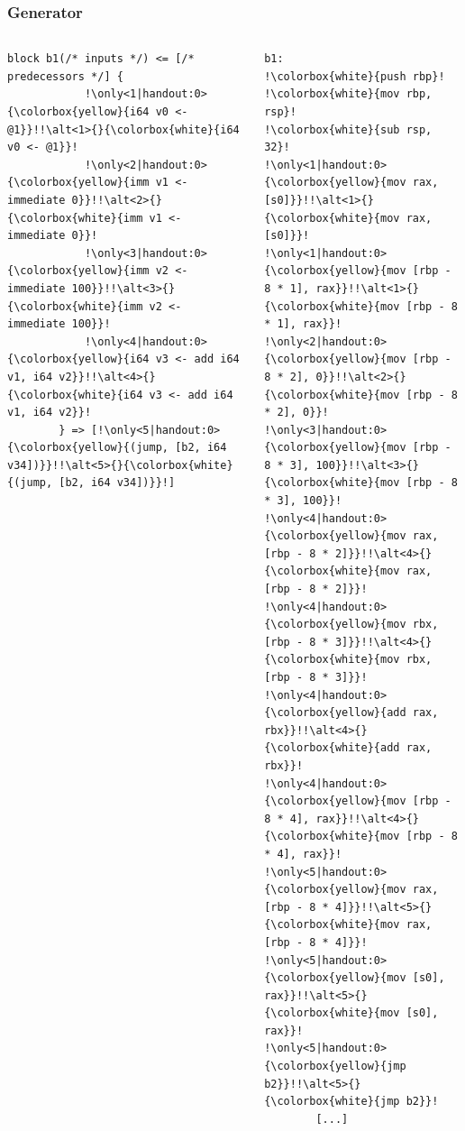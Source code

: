 \begin{frame}[fragile]
    \frametitle{Generator}
    \begin{columns}[c]
        \begin{lstlisting}[language=SbtIr, escapechar=!]
        block b1(/* inputs */) <= [/* predecessors */] {
            !\only<1|handout:0>{\colorbox{yellow}{i64 v0 <- @1}}!!\alt<1>{}{\colorbox{white}{i64 v0 <- @1}}!
            !\only<2|handout:0>{\colorbox{yellow}{imm v1 <- immediate 0}}!!\alt<2>{}{\colorbox{white}{imm v1 <- immediate 0}}!
            !\only<3|handout:0>{\colorbox{yellow}{imm v2 <- immediate 100}}!!\alt<3>{}{\colorbox{white}{imm v2 <- immediate 100}}!
            !\only<4|handout:0>{\colorbox{yellow}{i64 v3 <- add i64 v1, i64 v2}}!!\alt<4>{}{\colorbox{white}{i64 v3 <- add i64 v1, i64 v2}}!
        } => [!\only<5|handout:0>{\colorbox{yellow}{(jump, [b2, i64 v34])}}!!\alt<5>{}{\colorbox{white}{(jump, [b2, i64 v34])}}!]
    \end{lstlisting}


        \begin{lstlisting}[language=rv64, escapechar=!]
b1:
!\colorbox{white}{push rbp}!
!\colorbox{white}{mov rbp, rsp}!
!\colorbox{white}{sub rsp, 32}!
!\only<1|handout:0>{\colorbox{yellow}{mov rax, [s0]}}!!\alt<1>{}{\colorbox{white}{mov rax, [s0]}}!
!\only<1|handout:0>{\colorbox{yellow}{mov [rbp - 8 * 1], rax}}!!\alt<1>{}{\colorbox{white}{mov [rbp - 8 * 1], rax}}!
!\only<2|handout:0>{\colorbox{yellow}{mov [rbp - 8 * 2], 0}}!!\alt<2>{}{\colorbox{white}{mov [rbp - 8 * 2], 0}}!
!\only<3|handout:0>{\colorbox{yellow}{mov [rbp - 8 * 3], 100}}!!\alt<3>{}{\colorbox{white}{mov [rbp - 8 * 3], 100}}!
!\only<4|handout:0>{\colorbox{yellow}{mov rax, [rbp - 8 * 2]}}!!\alt<4>{}{\colorbox{white}{mov rax, [rbp - 8 * 2]}}!
!\only<4|handout:0>{\colorbox{yellow}{mov rbx, [rbp - 8 * 3]}}!!\alt<4>{}{\colorbox{white}{mov rbx, [rbp - 8 * 3]}}!
!\only<4|handout:0>{\colorbox{yellow}{add rax, rbx}}!!\alt<4>{}{\colorbox{white}{add rax, rbx}}!
!\only<4|handout:0>{\colorbox{yellow}{mov [rbp - 8 * 4], rax}}!!\alt<4>{}{\colorbox{white}{mov [rbp - 8 * 4], rax}}!
!\only<5|handout:0>{\colorbox{yellow}{mov rax, [rbp - 8 * 4]}}!!\alt<5>{}{\colorbox{white}{mov rax, [rbp - 8 * 4]}}!
!\only<5|handout:0>{\colorbox{yellow}{mov [s0], rax}}!!\alt<5>{}{\colorbox{white}{mov [s0], rax}}!
!\only<5|handout:0>{\colorbox{yellow}{jmp b2}}!!\alt<5>{}{\colorbox{white}{jmp b2}}!
        [...]
        \end{lstlisting}

    \end{columns}

\end{frame}
\clearpage

